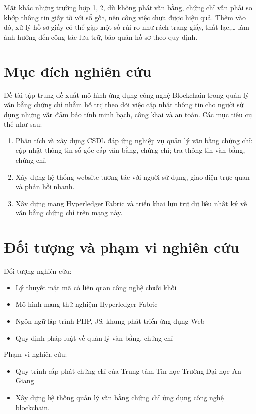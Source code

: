 Mặt khác những trường hợp 1, 2, dù không phát văn bằng, chứng chỉ vẫn phải so khớp thông tin giấy tờ với sổ gốc, nên công việc chưa được hiệu quả. Thêm vào đó, xử lý hồ sơ giấy có thể gặp một số rủi ro như rách trang giấy, thất lạc,\ldots{} làm ảnh hưởng đến công tác lưu trữ, bảo quản hồ sơ theo quy định.

\section{Mục đích nghiên cứu}

Đề tài tập trung đề xuất mô hình ứng dụng công nghệ Blockchain trong quản lý văn bằng chứng chỉ nhằm hỗ trợ theo dõi việc cập nhật thông tin cho người sử dụng nhưng vẫn đảm bảo tính minh bạch, công khai và an toàn. Các mục tiêu cụ thể như sau:

\begin{enumerate}
\item Phân tích và xây dựng CSDL đáp ứng nghiệp vụ quản lý văn bằng chứng chỉ: cập nhật thông tin sổ gốc cấp văn bằng, chứng chỉ; tra thông tin văn bằng, chứng chỉ.
\item Xây dựng hệ thống website tương tác với người sử dụng, giao diện trực quan và phản hồi nhanh.
\item Xây dựng mạng Hyperledger Fabric và triển khai lưu trữ dữ liệu nhật ký về văn bằng chứng chỉ trên mạng này.
\end{enumerate}

\section{Đối tượng và phạm vi nghiên cứu}

Đối tượng nghiên cứu:

\begin{itemize}
\item Lý thuyết mật mã có liên quan công nghệ chuỗi khối
\item Mô hình mạng thử nghiệm Hyperledger Fabric
\item Ngôn ngữ lập trình PHP, JS, khung phát triển ứng dụng Web
\item Quy định pháp luật về quản lý văn bằng, chứng chỉ
\end{itemize}

Phạm vi nghiên cứu:

\begin{itemize}
\item Quy trình cấp phát chứng chỉ của Trung tâm Tin học Trường Đại học An Giang
\item Xây dựng hệ thống quản lý văn bằng chứng chỉ ứng dụng công nghệ blockchain.
\end{itemize}

